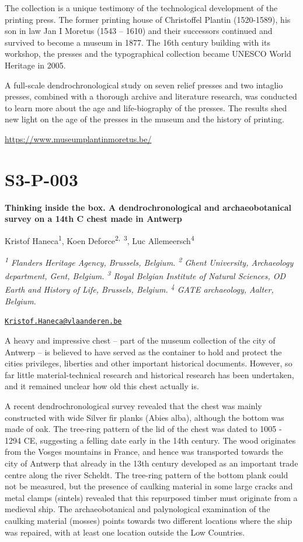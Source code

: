\documentclass[
]{book}
\begin{document}
The collection is a unique testimony of the technological development of the printing press. The former printing house of Christoffel Plantin (1520-1589), his son in law Jan I Moretus (1543 -- 1610) and their successors continued and survived to become a museum in 1877. The 16th century building with its workshop, the presses and the typographical collection became UNESCO World Heritage in 2005.

A full-scale dendrochronological study on seven relief presses and two intaglio presses, combined with a thorough archive and literature research, was conducted to learn more about the age and life-biography of the presses. The results shed new light on the age of the presses in the museum and the history of printing.

\url{https://www.museumplantinmoretus.be/}

\hypertarget{s3-p-003}{%
\section*{S3-P-003}\label{s3-p-003}}

\textbf{Thinking inside the box. A dendrochronological and archaeobotanical survey on a 14th C chest made in Antwerp}

Kristof Haneca\textsuperscript{1}, Koen Deforce\textsuperscript{2,~3}, Luc Allemeersch\textsuperscript{4}

\emph{\textsuperscript{1} Flanders Heritage Agency, Brussels, Belgium. \textsuperscript{2} Ghent University, Archaeology department, Gent, Belgium. \textsuperscript{3} Royal Belgian Institute of Natural Sciences, OD Earth and History of Life, Brussels, Belgium. \textsuperscript{4} GATE archaeology, Aalter, Belgium.}

\href{mailto:Kristof.Haneca@vlaanderen.be}{\nolinkurl{Kristof.Haneca@vlaanderen.be}}

A heavy and impressive chest -- part of the museum collection of the city of Antwerp -- is believed to have served as the container to hold and protect the cities privileges, liberties and other important historical documents. However, so far little material-technical research and historical research has been undertaken, and it remained unclear how old this chest actually is.

A recent dendrochronological survey revealed that the chest was mainly constructed with wide Silver fir planks (Abies alba), although the bottom was made of oak. The tree-ring pattern of the lid of the chest was dated to 1005 - 1294 CE, suggesting a felling date early in the 14th century. The wood originates from the Vosges mountains in France, and hence was transported towards the city of Antwerp that already in the 13th century developed as an important trade centre along the river Scheldt. The tree-ring pattern of the bottom plank could not be measured, but the presence of caulking material in some large cracks and metal clamps (sintels) revealed that this repurposed timber must originate from a medieval ship. The archaeobotanical and palynological examination of the caulking material (mosses) points towards two different locations where the ship was repaired, with at least one location outside the Low Countries.
\end{document}

